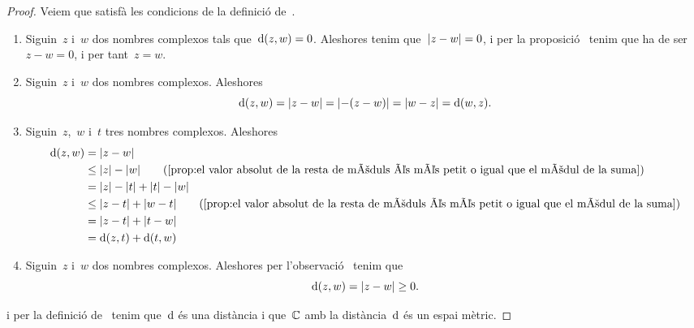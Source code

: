 \documentclass[../Apunts.tex]{subfiles}
\begin{document}
    \begin{proof}
        Veiem que satisfà les condicions de la definició de~.
        \begin{enumerate}
            \item Siguin~\(z\) i~\(w\) dos nombres complexos tals
                que~\(\operatorname{d}(z,w)=0\).
                Aleshores tenim que~\(\modul{z-w}=0\), i per la
                proposició~ tenim que ha de ser~\(z-w=0\),
                i per tant~\(z=w\).
            \item Siguin~\(z\) i~\(w\) dos nombres complexos.
                Aleshores
                \[
                    \distancia(z,w)
                    =\modul{z-w}
                    =\modul{-(z-w)}
                    =\modul{w-z}
                    =\distancia(w,z).
                \]
            \item Siguin~\(z\),~\(w\) i~\(t\) tres nombres complexos.
                Aleshores
                \begin{align*}
                    \distancia(z,w)&=\modul{z-w} \\
                    &\leq\modul{z}-\modul{w}
                    \tag{\ref{prop:el valor absolut de la resta de mòduls és %
                    més petit o igual que el mòdul de la suma}}\\
                    &=\modul{z}-\modul{t}+\modul{t}-\modul{w} \\
                    &\leq\modul{z-t}+\modul{w-t}
                    \tag{\ref{prop:el valor absolut de la resta de mòduls és %
                    més petit o igual que el mòdul de la suma}}\\
                    &=\modul{z-t}+\modul{t-w} \\
                    &=\distancia(z,t)+\distancia(t,w)
                \end{align*}
            \item Siguin~\(z\) i~\(w\) dos nombres complexos.
                Aleshores per l'observació~ tenim que
            \[\distancia(z,w)=\modul{z-w}\geq0.\]
        \end{enumerate}
        i per la definició de~ tenim que~\(\operatorname{d}\)
        és una distància i que~\(\mathbb{C}\) amb la distància~\(\operatorname{d}\) és un
        espai mètric.
    \end{proof}
\end{document}
